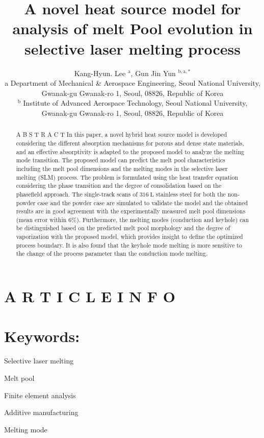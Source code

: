 \documentclass[10pt]{article}
\title{A novel heat source model for analysis of melt Pool evolution in selective laser melting process }
\author{Kang-Hyun. Lee ${ }^{\mathrm{a}}$, Gun Jin Yun ${ }^{\mathrm{b}, \mathrm{a}, *}$\\
a Department of Mechanical \& Aerospace Engineering, Seoul National University, Gwanak-gu Gwanak-ro 1, Seoul, 08826, Republic of Korea\\
${ }^{\mathrm{b}}$ Institute of Advanced Aerospace Technology, Seoul National University, Gwanak-gu Gwanak-ro 1, Seoul, 08826, Republic of Korea}
\date{}
\begin{document}
\maketitle


\section*{A R T I C L E I N F O}
\section*{Keywords:}
Selective laser melting

Melt pool

Finite element analysis

Additive manufacturing

Melting mode

\begin{abstract}
A B S T R A C T In this paper, a novel hybrid heat source model is developed considering the different absorption mechanisms for porous and dense state materials, and an effective absorptivity is adapted to the proposed model to analyze the melting mode transition. The proposed model can predict the melt pool characteristics including the melt pool dimensions and the melting modes in the selective laser melting (SLM) process. The problem is formulated using the heat transfer equation considering the phase transition and the degree of consolidation based on the phasefield approach. The single-track scans of $316 \mathrm{~L}$ stainless steel for both the non-powder case and the powder case are simulated to validate the model and the obtained results are in good agreement with the experimentally measured melt pool dimensions (mean error within 6\%). Furthermore, the melting modes (conduction and keyhole) can be distinguished based on the predicted melt pool morphology and the degree of vaporization with the proposed model, which provides insight to define the optimized process boundary. It is also found that the keyhole mode melting is more sensitive to the change of the process parameter than the conduction mode melting.
\end{abstract}
\end{document}
